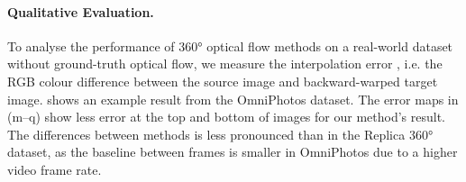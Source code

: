 \paragraph{Qualitative Evaluation.}

To analyse the performance of 360° optical flow methods on a real-world dataset without ground-truth optical flow, we measure the interpolation error \cite{BakerSLRBS2011}, i.e. the RGB colour difference between the source image and backward-warped target image.
%
 shows an example result from the OmniPhotos dataset.
The error maps in (m–q) show less error at the top and bottom of images for our method's result.
The differences between methods is less pronounced than in the Replica 360° dataset, as the baseline between frames is smaller in OmniPhotos due to a higher video frame rate.



